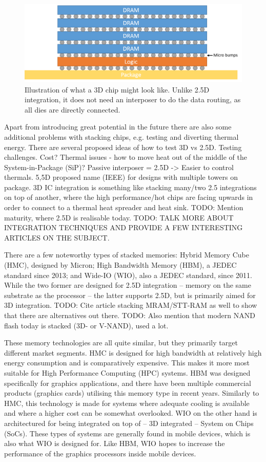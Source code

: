 \begin{figure}[!h]
\centering
\includegraphics[width=0.75\linewidth]{figure/3D-integration.png}
\caption{Illustration of what a 3D chip might look like. Unlike 2.5D integration, it does not need an interposer to do the data routing, as all dies are directly connected. }
\label{3D-chip}
\end{figure}

Apart from introducing great potential in the future there are also some additional problems with stacking chips, e.g. testing and diverting thermal energy. There are several proposed ideas of how to test 
3D vs 2.5D. Testing challenges. Cost? Thermal issues - how to move heat out of the middle of the System-in-Package (SiP)?
Passive interposer = 2.5D -> Easier to control thermals. 5,5D proposed name (IEEE) for designs with multiple towers on package. 3D IC integration is something like stacking many/two 2.5 integrations on top of another, where the high performance/hot chips are facing upwards in order to connect to a thermal heat spreader and heat sink. TODO: Mention maturity, where 2.5D is realisable today.
TODO: TALK MORE ABOUT INTEGRATION TECHNIQUES AND PROVIDE A FEW INTERESTING ARTICLES ON THE SUBJECT.
\bigskip

There are a few noteworthy types of stacked memories: Hybrid Memory Cube (HMC), designed by Micron; High Bandwidth Memory (HBM), a JEDEC standard since 2013; and Wide-IO (WIO), also a JEDEC standard, since 2011. While the two former are designed for 2.5D integration -- memory on the same substrate as the processor -- the latter supports 2.5D, but is primarily aimed for 3D integration. TODO: Cite article stacking MRAM/STT-RAM as well to show that there are alternatives out there. TODO: Also mention that modern NAND flash today is stacked (3D- or V-NAND), used a lot. 
\bigskip

These memory technologies are all quite similar, but they primarily target different market segments. HMC is designed for high bandwidth at relatively high energy consumption and is comparatively expensive. This makes it more most suitable for High Performance Computing (HPC) systems. HBM was designed specifically for graphics applications, and there have been multiple commercial products (graphics cards) utilising this memory type in recent years. Similarly to HMC, this technology is made for systems where adequate cooling is available and where a higher cost can be somewhat overlooked. WIO on the other hand is architectured for being integrated on top of -- 3D integrated -- System on Chips (SoCs). These types of systems are generally found in mobile devices, which is also what WIO is designed for. Like HBM, WIO hopes to increase the performance of the graphics processors inside mobile devices. 
\bigskip

